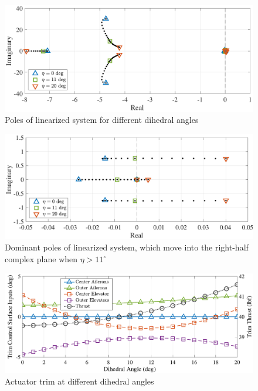 \documentclass[english]{ifacconf}
\begin{document}
\begin{figure}[htbp]
	\centering
	\includegraphics[width=0.95\columnwidth]{../fig/trim-poles-2.pdf}
	\caption{Poles of linearized system for different dihedral angles}
	\label{fig:trim-poles}
\end{figure}

\begin{figure}[htbp]
	\centering
	\includegraphics[width=0.95\columnwidth]{../fig/trim-poles-zoom-2.pdf}
	\caption{Dominant poles of linearized system, which move into the right-half complex plane when $\eta > 11^\circ$}
	\label{fig:trim-poles-zoom}
\end{figure}

\begin{figure}[htbp]
	\centering
	\includegraphics[width=0.95\columnwidth]{../fig/trim-inputs-3.pdf}
	\caption{Actuator trim at different dihedral angles}
	\label{fig:trim-inputs}
\end{figure}
\end{document}
